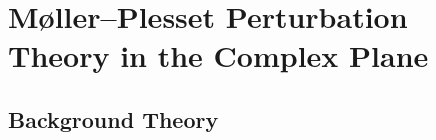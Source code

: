 \documentclass[aps,prb,reprint,noshowkeys,linenumbers,superscriptaddress]{revtex4-1}
\newcommand{\titou}[1]{\textcolor{red}{#1}}
\begin{document}

\section{M{\o}ller--Plesset Perturbation Theory in the Complex Plane}
\label{sec:MP}


\subsection{Background Theory}
\end{document}
